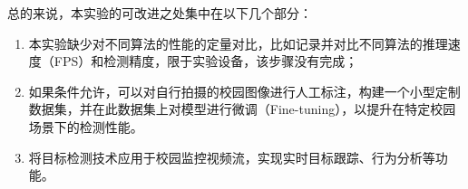 总的来说，本实验的可改进之处集中在以下几个部分：
\begin{enumerate}
    \item 本实验缺少对不同算法的性能的定量对比，比如记录并对比不同算法的推理速度（FPS）和检测精度，限于实验设备，该步骤没有完成；
    \item 如果条件允许，可以对自行拍摄的校园图像进行人工标注，构建一个小型定制数据集，并在此数据集上对模型进行微调（Fine-tuning），以提升在特定校园场景下的检测性能。
    \item 将目标检测技术应用于校园监控视频流，实现实时目标跟踪、行为分析等功能。
\end{enumerate}
